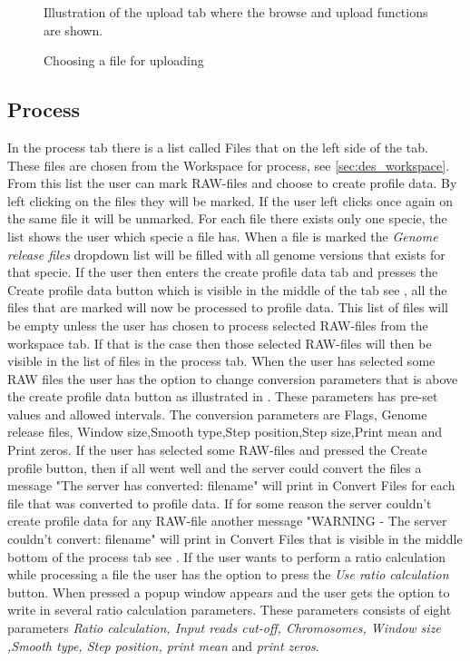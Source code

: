 \begin{figure}[htb]
	\caption{Illustration of the upload tab where the browse and upload functions are shown.}
	\label{fig:des_upload-view}
\end{figure}

\begin{figure}[htb]
	\caption{Choosing a file for uploading}
	\label{fig:des_upload}
\end{figure}


\subsection{Process}
In the process tab there is a list called Files that on the left side of the tab. These files are chosen from the Workspace for process, see \ref{sec:des_workspace}. From this list the user can mark RAW-files and choose to create profile data. By left clicking on the files they will be marked. If the user left clicks once again on the same file it will be unmarked. For each file there exists only one specie, the list shows the user which specie a file has. When a file is marked the \emph{Genome release files} dropdown list will be filled with all genome versions that exists for that specie. If the user then enters the create profile data tab and presses the Create profile data button which is visible in the middle of the tab see , all the files that are marked will now be processed to profile data. This list of files will be empty unless the user has chosen to process selected RAW-files from the workspace tab. If that is the case then those selected RAW-files will then be visible in the list of files in the process tab. When the user has selected some RAW files the user has the option to change conversion parameters that is above the create profile data button as illustrated in . These parameters has pre-set values and allowed intervals. The conversion parameters are Flags, Genome release files, Window size,Smooth type,Step position,Step size,Print mean and Print zeros. If the user has selected some RAW-files and pressed the Create profile button, then if all went well and the server could convert the files a message "The server has converted: filename" will print in Convert Files for each file that was converted to profile data. If for some reason the server couldn't create profile data for any RAW-file another message "WARNING - The server couldn't convert: filename" will print in Convert Files that is visible in the middle bottom of the process tab see . If the user wants to perform a ratio calculation while processing a file the user has the option to press the \emph{Use ratio calculation} button. When pressed a popup window appears and the user gets the option to write in several ratio calculation parameters. These parameters consists of eight parameters \emph{Ratio calculation, Input reads cut-off, Chromosomes, Window size ,Smooth type, Step position, print mean} and  \emph{print zeros}.


